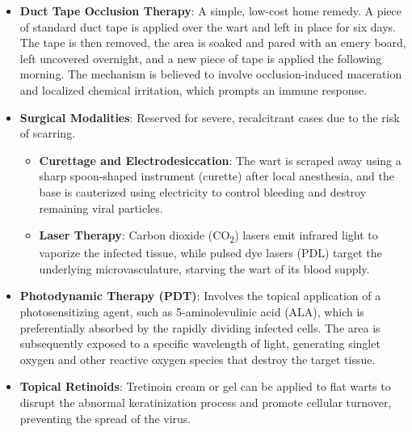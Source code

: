 \begin{itemize}
\begin{itemize}
        \item \textbf{Topical Sensitizers}: Compounds like diphencyprone (DPC) or squaric acid dibutyl ester (SADBE) are applied to the skin to induce a localized allergic contact dermatitis, recruiting lymphocytes to clear the wart.
        \item \textbf{Imiquimod}: A topical cream (typically 5\% concentration) that acts as an immune response modifier by binding to toll-like receptor 7 (TLR-7), stimulating the production of interferon-alpha and other cytokines to combat the viral infection.
    \end{itemize}
    \item \textbf{Duct Tape Occlusion Therapy}: A simple, low-cost home remedy. A piece of standard duct tape is applied over the wart and left in place for six days. The tape is then removed, the area is soaked and pared with an emery board, left uncovered overnight, and a new piece of tape is applied the following morning. The mechanism is believed to involve occlusion-induced maceration and localized chemical irritation, which prompts an immune response.
    \item \textbf{Surgical Modalities}: Reserved for severe, recalcitrant cases due to the risk of scarring.
    \begin{itemize}
        \item \textbf{Curettage and Electrodesiccation}: The wart is scraped away using a sharp spoon-shaped instrument (curette) after local anesthesia, and the base is cauterized using electricity to control bleeding and destroy remaining viral particles.
        \item \textbf{Laser Therapy}: Carbon dioxide (CO\textsubscript{2}) lasers emit infrared light to vaporize the infected tissue, while pulsed dye lasers (PDL) target the underlying microvasculature, starving the wart of its blood supply.
    \end{itemize}
    \item \textbf{Photodynamic Therapy (PDT)}: Involves the topical application of a photosensitizing agent, such as 5-aminolevulinic acid (ALA), which is preferentially absorbed by the rapidly dividing infected cells. The area is subsequently exposed to a specific wavelength of light, generating singlet oxygen and other reactive oxygen species that destroy the target tissue.
    \item \textbf{Topical Retinoids}: Tretinoin cream or gel can be applied to flat warts to disrupt the abnormal keratinization process and promote cellular turnover, preventing the spread of the virus.
\end{itemize}

